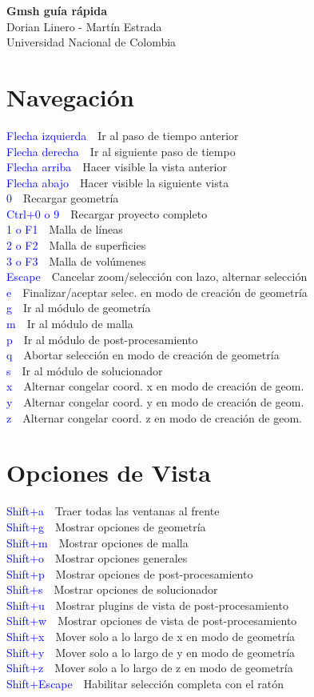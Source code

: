 \documentclass[10pt, twocolumn]{article}
\newcommand{\command}[2]{\textcolor{blue}{#1}~\dotfill{}~#2\\} %
\begin{document}

\thispagestyle{empty} %

\begin{center}
    {\LARGE\bfseries Gmsh guía rápida} \\ 
    {Dorian Linero - Martín Estrada} \\
    {Universidad Nacional de Colombia}
\end{center}


\section*{Navegación}

\command{Flecha izquierda}{Ir al paso de tiempo anterior}
\command{Flecha derecha}{Ir al siguiente paso de tiempo}
\command{Flecha arriba}{Hacer visible la vista anterior}
\command{Flecha abajo}{Hacer visible la siguiente vista}
\command{0}{Recargar geometría}
\command{Ctrl+0 o 9}{Recargar proyecto completo}
\command{1 o F1}{Malla de líneas}
\command{2 o F2}{Malla de superficies}
\command{3 o F3}{Malla de volúmenes}
\command{Escape}{Cancelar zoom/selección con lazo, alternar selección}
\command{e}{Finalizar/aceptar selec. en modo de creación de geometría}
\command{g}{Ir al módulo de geometría}
\command{m}{Ir al módulo de malla}
\command{p}{Ir al módulo de post-procesamiento}
\command{q}{Abortar selección en modo de creación de geometría}
\command{s}{Ir al módulo de solucionador}
\command{x}{Alternar congelar coord. x en modo de creación de geom.}
\command{y}{Alternar congelar coord. y en modo de creación de geom.}
\command{z}{Alternar congelar coord. z en modo de creación de geom.}


\section*{Opciones de Vista}

\command{Shift+a}{Traer todas las ventanas al frente}
\command{Shift+g}{Mostrar opciones de geometría}
\command{Shift+m}{Mostrar opciones de malla}
\command{Shift+o}{Mostrar opciones generales}
\command{Shift+p}{Mostrar opciones de post-procesamiento}
\command{Shift+s}{Mostrar opciones de solucionador}
\command{Shift+u}{Mostrar plugins de vista de post-procesamiento}
\command{Shift+w}{Mostrar opciones de vista de post-procesamiento}
\command{Shift+x}{Mover solo a lo largo de x en modo de geometría}
\command{Shift+y}{Mover solo a lo largo de y en modo de geometría}
\command{Shift+z}{Mover solo a lo largo de z en modo de geometría}
\command{Shift+Escape}{Habilitar selección completa con el ratón}
\end{document}
